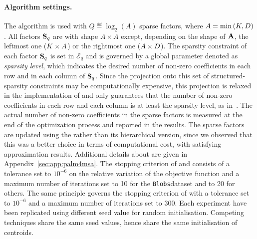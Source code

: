 \paragraph{Algorithm settings.} 
The \qkmeans algorithm is used with $Q\eqdef\log_2\left (A\right )$ sparse factors, where  $A=\min\left (K, D\right )$. 
All factors ${\mathbf{S}}_q$ are with shape $A \times A$ except, depending on the shape of ${\mathbf{A}}$, the leftmost one ($K\times A$) or the rightmost one ($A\times D$). 
The sparsity constraint of each factor ${\mathbf{S}}_q$ is set in $\mathcal{E}_q$ and is governed by a global parameter denoted as \textit{sparsity level}, which indicates the desired number of non-zero coefficients in each row and in each column of ${\mathbf{S}}_q$. 
Since the projection onto this set of structured-sparsity constraints may be computationally expensive, this projection is relaxed in the implementation of \palm and only guarantees that the number of non-zero coefficients in each row and each column is at least the sparsity level, as in~\cite{LeMagoarou2016Flexible}.
The actual number of non-zero coefficients in the sparse factors is measured at the end of the optimization process and reported in the results.
The sparse factors are updated using the \palm rather than its hierarchical version, since we observed that this was a better choice in terms of computational cost, with satisfying approximation results.
Additional details about \palm are given in Appendix~\ref{sec:app:palm4msa}.
The stopping criterion of \kmeans and \qkmeans consists of a tolerance set to $10^{-6}$ on the relative variation of the objective function and a maximum number of iterations set to 10 for the \texttt{Blobs}dataset and to 20 for others. The same principle governs the stopping criterion of \palm with a tolerance set to $10^{-6}$ and a maximum number of iterations set to 300. Each experiment have been replicated using different seed value for random initialisation. Competing techniques share the same seed values, hence share the same initialisation of centroids.

%


